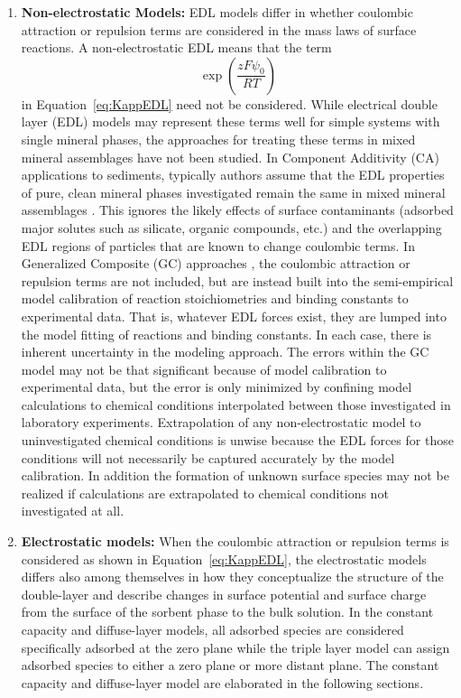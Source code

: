 \begin{enumerate}
\item \textbf{Non-electrostatic Models:}
EDL models differ in whether coulombic attraction or repulsion terms are considered in the mass laws of surface reactions. A non-electrostatic EDL means that the term
\begin{equation}  \label{eq:ElectrostaticExponential}
  \exp\left(\frac{zF\psi_0 }{RT}\right) 
\end{equation}
in Equation~\eqref{eq:KappEDL} need not be considered. 
While electrical double layer (EDL) models may represent these terms well for simple systems with single mineral phases, 
the approaches for treating these terms in mixed mineral assemblages have not been studied. 
In Component Additivity (CA) \citep{davis-2004, davis-1998} applications to sediments, 
typically authors assume that the EDL properties of pure, clean mineral phases 
investigated remain the same in mixed mineral assemblages \citep{davis-2004}. 
This ignores the likely effects of surface contaminants (adsorbed major solutes such as silicate, organic compounds, etc.) 
and the overlapping EDL regions of particles that are known to change coulombic terms. 
In Generalized Composite (GC) approaches \citep{davis-2004, davis-1998}, 
the coulombic attraction or repulsion terms are not included, 
but are instead built into the semi-empirical model calibration of reaction stoichiometries and binding constants to experimental data. 
That is, whatever EDL forces exist, they are lumped into the model fitting of reactions and binding constants. 
In each case, there is inherent uncertainty in the modeling approach. 
The errors within the GC model may not be that significant because of model calibration to experimental data, 
but the error is only minimized by confining model calculations to chemical conditions interpolated between those 
investigated in laboratory experiments. 
Extrapolation of any non-electrostatic model to uninvestigated chemical conditions is unwise 
because the EDL forces for those conditions will not necessarily be captured accurately by the model calibration. 
In addition the formation of unknown surface species may not be realized if calculations are extrapolated to chemical conditions 
not investigated at all.

\item \textbf{Electrostatic models:}
When the coulombic attraction or repulsion terms is considered as shown in Equation~\eqref{eq:KappEDL}, 
the electrostatic models differs also among themselves in how they conceptualize the structure of the double-layer 
and describe changes in surface potential and surface charge from the surface of the sorbent phase to the bulk solution. 
In the constant capacity and diffuse-layer models, all adsorbed species are considered specifically adsorbed at the zero plane 
while the triple layer model can assign adsorbed species to either a zero plane or more distant plane. 
The constant capacity and diffuse-layer model are elaborated in the following sections.  


\end{enumerate}

